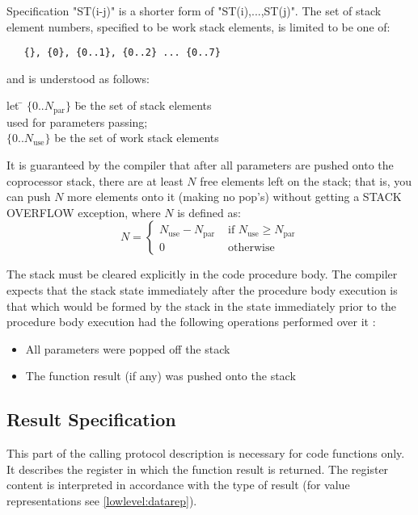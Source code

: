    Specification "ST(i-j)" is a shorter form of "ST(i),...,ST(j)".
 The set of stack element numbers, specified to be work stack elements,
 is limited to be one of:
\begin{verbatim}
   {}, {0}, {0..1}, {0..2} ... {0..7}
\end{verbatim}
 and is understood as follows:
\begin{tabbing}
   let \= $ \{0..N_{\mbox{par}}\}$ \= be the set of stack elements  \\
       \>                       \> used for parameters passing;  \\
\>        $\{0..N_{\mbox{use}}\}$   \> be the set of work stack elements \\
\end{tabbing}
It is guaranteed by the compiler that after all parameters
are pushed onto the coprocessor stack, there are at least $N$ free elements left
on the stack; that is, you can push $N$ more elements onto it (making no pop's)
without getting a STACK OVERFLOW exception, where $N$ is defined as:
$$ N = \left \{
        \begin{array}{ll}
           N_{\mbox{use}} - N_{\mbox{par}} & \mbox{ if } N_{\mbox{use}}\geq N_{\mbox{par}} \\
           0                         & \mbox{ otherwise}
        \end{array}
       \right .
$$

The stack must be cleared explicitly in the code procedure body.
The compiler expects that the stack state immediately after the procedure body
execution is that which would be formed by the stack in the state immediately
prior to the procedure body execution had the following operations
performed over it :

\begin{itemize}
\item   All parameters were popped off the stack
\item   The function result (if any) was pushed onto the stack
\end{itemize}

\subsection{Result Specification}

This part of the calling protocol description is necessary for code
functions only. It describes the register in which
the function result is returned.
The register content is interpreted in accordance with the type of result
(for value representations see \ref{lowlevel:datarep}).

